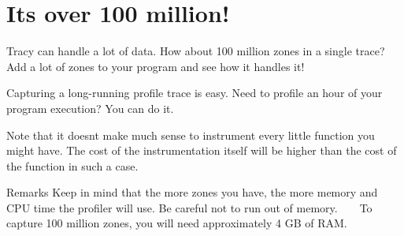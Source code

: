 \chapter{It\textquotesingle{}s over 100 million! }
\hypertarget{md__mono_engine_2thirdparty_2tracy_2profiler_2src_2achievements_2100_million}{}\label{md__mono_engine_2thirdparty_2tracy_2profiler_2src_2achievements_2100_million}
\label{md__mono_engine_2thirdparty_2tracy_2profiler_2src_2achievements_2100_million_autotoc_md1103}%
%


Tracy can handle a lot of data. How about 100 million zones in a single trace? Add a lot of zones to your program and see how it handles it!

Capturing a long-\/running profile trace is easy. Need to profile an hour of your program execution? You can do it.

Note that it doesn\textquotesingle{}t make much sense to instrument every little function you might have. The cost of the instrumentation itself will be higher than the cost of the function in such a case.

\begin{DoxyRemark}{Remarks}
Keep in mind that the more zones you have, the more memory and CPU time the profiler will use. Be careful not to run out of memory. ~\newline
~\newline
 To capture 100 million zones, you will need approximately 4 GB of RAM. 
\end{DoxyRemark}
